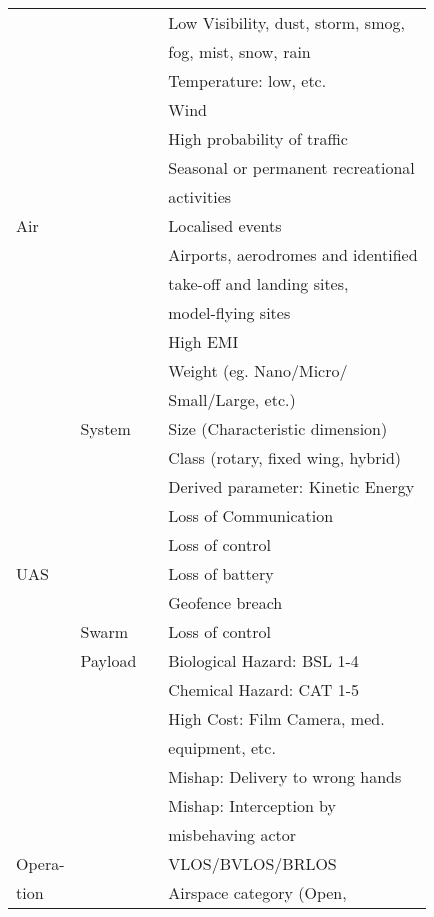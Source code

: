 \documentclass{ua_wgs_base}
\begin{document}
\begin{centering}
\begin{longtable}{|l|l|l|l|}
  & & & Low Visibility, dust, storm, smog, \\\cline{4-4}
  & & & fog, mist, snow, rain \\\cline{4-4}
  & & & Temperature: low, etc. \\\cline{4-4}
  & & & Wind \\\cline{1-4}
 \multirow{7}{3em}{Air} & & & High probability of traffic \\\cline{4-4}
  & & & Seasonal or permanent recreational \\
  & & & activities \\\cline{4-4}
  & & & Localised events \\\cline{4-4}
  & & & Airports, aerodromes and identified  \\
  & & & take-off and landing sites,  \\
  & & & model-flying sites \\\cline{1-4}
  & & & High EMI \\
  \multirow{15}{3em}{UAS} & \multirow{5}{7em}{System} & & Weight (eg. Nano/Micro/\\
  & & & Small/Large, etc.) \\\cline{4-4}
   & & & Size (Characteristic dimension) \\\cline{4-4}
   & & & Class (rotary, fixed wing, hybrid) \\\cline{4-4}
   & & & Derived parameter: Kinetic Energy \\\cline{4-4}
   & & & Loss of Communication \\\cline{4-4}
   & & & Loss of control \\\cline{4-4}
   & & & Loss of battery \\\cline{4-4}
   & & & Geofence breach \\\cline{2-4}
   & Swarm & & Loss of control \\\cline{2-4}
   & Payload & & Biological Hazard: BSL 1-4 \\\cline{4-4}
   & & & Chemical Hazard: CAT 1-5 \\\cline{4-4}
   & & & High Cost: Film Camera, med. \\
   & & & equipment, etc. \\\cline{4-4}
   & & & Mishap: Delivery to wrong hands \\\cline{4-4}
   & & & Mishap: Interception by \\
   & & & misbehaving actor  \\\cline{1-4}
   Opera- & & & VLOS/BVLOS/BRLOS \\\cline{4-4}
   tion & & & Airspace category (Open, \\

\end{longtable}
\end{centering}
\end{document}
